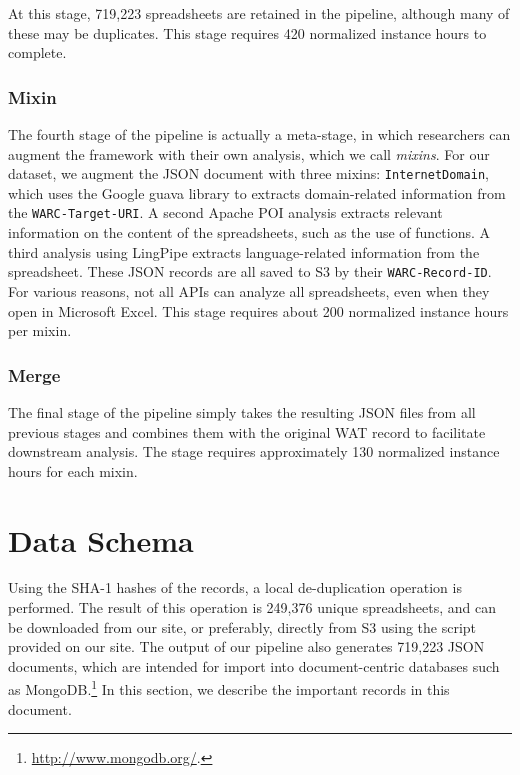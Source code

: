 \documentclass[conference]{IEEEtran}
\begin{document}
At this stage, 719,223 spreadsheets are retained in the pipeline, although many of these may be duplicates. This stage requires 420 normalized instance hours to complete.

\subsubsection{Mixin} 

The fourth stage of the pipeline is actually a meta-stage, in which researchers can augment the framework with their own analysis, which we call \emph{mixins}. For our dataset, we augment the JSON document with three mixins: \texttt{InternetDomain}, which uses the Google guava library to extracts domain-related information from the \texttt{WARC-Target-URI}. A second Apache POI analysis extracts relevant information on the content of the spreadsheets, such as the use of functions. A third analysis using LingPipe extracts language-related information from the spreadsheet. These JSON records are all saved to S3 by their \texttt{WARC-Record-ID}. For various reasons, not all APIs can analyze all spreadsheets, even when they open in Microsoft Excel. This stage requires about 200 normalized instance hours per mixin.

\subsubsection{Merge} 

The final stage of the pipeline simply takes the resulting JSON files from all previous stages and combines them with the original WAT record to facilitate downstream analysis. The stage requires approximately 130 normalized instance hours for each mixin.






\section{Data Schema}
\label{sec:schema}

Using the SHA-1 hashes of the records, a local de-duplication operation is performed. The result of this operation is 249,376 unique spreadsheets, and can be downloaded from our site, or preferably, directly from S3 using the script provided on our site. The output of our pipeline also generates 719,223 JSON documents, which are intended for import into document-centric databases such as MongoDB.\footnote{\url{http://www.mongodb.org/}.} In this section, we describe the important records in this document.
\end{document}
